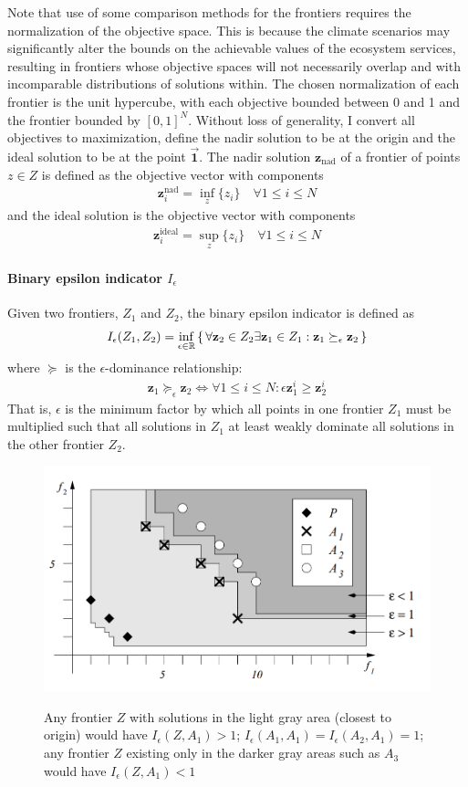 Note that use of some comparison methods for the frontiers requires the normalization of the objective space. This is because the climate scenarios may significantly alter the bounds on the achievable values of the ecosystem services, resulting in frontiers whose objective spaces will not necessarily overlap and with incomparable distributions of solutions within. The chosen normalization of each frontier is the unit hypercube, with each objective bounded between 0 and 1 and the frontier bounded by $[0,1]^N$. Without loss of generality, I convert all objectives to maximization, define the nadir solution to be at the origin and the ideal solution to be at the point $\vec{\mathbf{1}}$. The nadir solution $\mathbf{z}_{\text{nad}}$ of a frontier of points $z \in Z$ is defined as the objective vector with components
\begin{align}
\mathbf{z}_i^{\text{nad}} = \inf_{z} \{ z_i \} \quad \forall 1 \le i \le N
\end{align}
and the ideal solution is the objective vector with components
\begin{align}
\mathbf{z}_i^{\text{ideal}} = \sup_{z} \{ z_i \} \quad \forall 1 \le i \le N
\end{align}

\paragraph{Binary epsilon indicator $I_\epsilon$} Given two frontiers, $Z_1$ and $Z_2$, the binary epsilon indicator is defined as \cite{zitzler2003performance}
\begin{align}
I_\epsilon (Z_1,Z_2) = \inf_{\epsilon \in \mathbb{R}} \set{\forall \mathbf{z}_2 \in Z_2 \exists \mathbf{z}_1 \in Z_1 : \mathbf{z}_1 \succeq_\epsilon \mathbf{z}_2}
\end{align}
where $\succeq$ is the $\epsilon$-dominance relationship:
\begin{align}
\mathbf{z}_1 \succeq_\epsilon \mathbf{z}_2 \iff \forall 1 \le i \le N : \epsilon \mathbf{z}_1^i \ge \mathbf{z}_2^i
\end{align}
That is, $\epsilon$ is the minimum factor by which all points in one frontier $Z_1$ must be multiplied such that all solutions in $Z_1$ at least weakly dominate all solutions in the other frontier $Z_2$.
\begin{figure}
\centering
\includegraphics[width=.5\textwidth]{../images/BinaryEpsilonFigureLiftedFromZitzler}
\label{fig:binaryEpsilon}
\caption[Breakpoint values for the binary epsilon indicator $I_\epsilon$]{Any frontier $Z$ with solutions in the light gray area (closest to origin) would have $I_\epsilon (Z,A_1) > 1$; $I_\epsilon (A_1,A_1) = I_\epsilon (A_2,A_1) = 1$; any frontier $Z$ existing only in the darker gray areas such as $A_3$ would have $I_\epsilon (Z,A_1) < 1$}
\end{figure}

